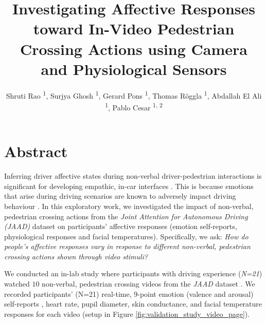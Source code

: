 \documentclass[acmlarge]{acmart}
\begin{document}
\title{Investigating Affective Responses toward In-Video Pedestrian Crossing Actions using Camera and Physiological Sensors}

\author{
    Shruti Rao \textsuperscript{1},
    Surjya Ghosh \textsuperscript{1},
    Gerard Pons \textsuperscript{1},
    Thomas R\"{o}ggla \textsuperscript{1},
    Abdallah El Ali \textsuperscript{1},
    Pablo Cesar \textsuperscript{1, 2}}

\renewcommand\shortauthors{Rao et al.}


\maketitle

\section*{Abstract}
Inferring driver affective states during non-verbal driver-pedestrian interactions is significant for developing empathic, in-car interfaces \cite{koch2021drivers}. This is because emotions that arise during driving scenarios are known to adversely impact driving behaviour \cite{2015:tf:jeon, sucha2017pedestrian, locken2019should}. In this exploratory work, we investigated the impact of non-verbal, pedestrian crossing actions from the \textit{Joint Attention for Autonomous Driving (JAAD)} \cite{2017:IV:rasouli} dataset on participants’  affective responses (emotion self-reports, physiological responses and facial temperatures). Specifically, we ask: \textit{How do people's affective responses vary in response to different non-verbal, pedestrian crossing actions shown through video stimuli?}

We conducted an in-lab study where participants with driving experience (\textit{N=21}) watched $10$ non-verbal, pedestrian crossing videos from the \textit{JAAD} dataset \cite{2017:IV:rasouli, Ghosh2022}. We recorded participants' (N=21) real-time, 9-point emotion (valence and arousal) self-reports \cite{bradley1994measuring}, heart rate, pupil diameter, skin conductance, and facial temperature responses for each video (setup in Figure \ref{fig:validation_study_video_page}).
\end{document}
